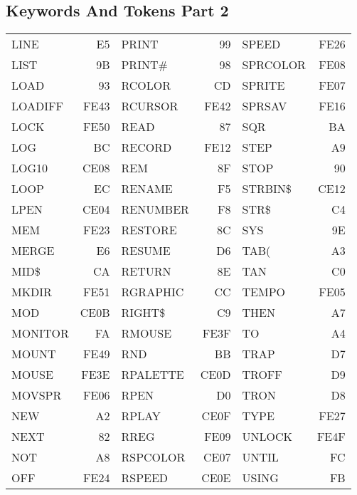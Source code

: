 \subsection{Keywords And Tokens Part 2}
{\ttfamily
\setlength{\tabcolsep}{1mm}
\begin{center}
\begin{tabular}{|p{2.2cm}r|p{2.2cm}r|p{2.2cm}r|}
\hline
LINE       &   E5 & PRINT      &   99 & SPEED      & FE26 \\
LIST       &   9B & PRINT\#    &   98 & SPRCOLOR   & FE08 \\
LOAD       &   93 & RCOLOR     &   CD & SPRITE     & FE07 \\
LOADIFF    & FE43 & RCURSOR    & FE42 & SPRSAV     & FE16 \\
LOCK       & FE50 & READ       &   87 & SQR        &   BA \\
LOG        &   BC & RECORD     & FE12 & STEP       &   A9 \\
LOG10      & CE08 & REM        &   8F & STOP       &   90 \\
LOOP       &   EC & RENAME     &   F5 & STRBIN\$   & CE12 \\
LPEN       & CE04 & RENUMBER   &   F8 & STR\$      &   C4 \\
MEM        & FE23 & RESTORE    &   8C & SYS        &   9E \\
MERGE      &   E6 & RESUME     &   D6 & TAB(       &   A3 \\
MID\$      &   CA & RETURN     &   8E & TAN        &   C0 \\
MKDIR      & FE51 & RGRAPHIC   &   CC & TEMPO      & FE05 \\
MOD        & CE0B & RIGHT\$    &   C9 & THEN       &   A7 \\
MONITOR    &   FA & RMOUSE     & FE3F & TO         &   A4 \\
MOUNT      & FE49 & RND        &   BB & TRAP       &   D7 \\
MOUSE      & FE3E & RPALETTE   & CE0D & TROFF      &   D9 \\
MOVSPR     & FE06 & RPEN       &   D0 & TRON       &   D8 \\
NEW        &   A2 & RPLAY      & CE0F & TYPE       & FE27 \\
NEXT       &   82 & RREG       & FE09 & UNLOCK     & FE4F \\
NOT        &   A8 & RSPCOLOR   & CE07 & UNTIL      &   FC \\
OFF        & FE24 & RSPEED     & CE0E & USING      &   FB \\

\end{tabular}
\end{center}}
